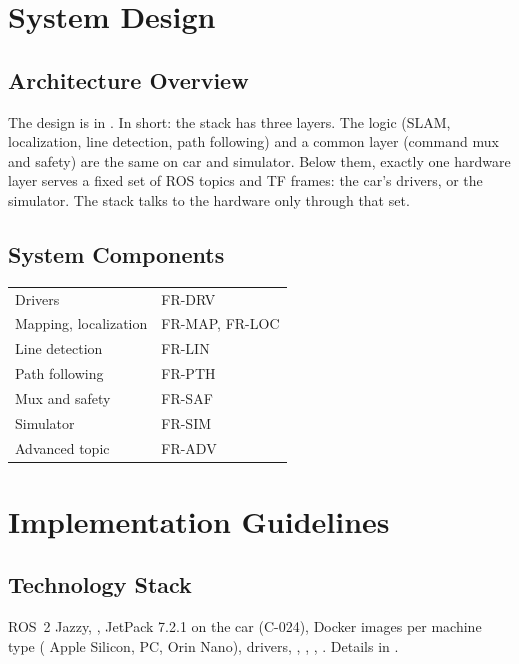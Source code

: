 \documentclass[11pt,a4paper]{article}
\begin{document}
\section{System Design}
\subsection{Architecture Overview}
The design is in . In short: the stack has three layers. The logic (SLAM, localization, line detection, path following) and a common layer (command mux and safety) are the same on car and simulator. Below them, exactly one hardware layer serves a fixed set of ROS topics and TF frames: the car's drivers, or the simulator. The stack talks to the hardware only through that set.

\subsection{System Components}
\begin{tabularx}{\textwidth}{@{}L{3.5cm} Y@{}}
\toprule
{} &  \\
\midrule
Drivers & FR-DRV \\
Mapping, localization & FR-MAP, FR-LOC \\
Line detection & FR-LIN \\
Path following & FR-PTH \\
Mux and safety & FR-SAF \\
Simulator & FR-SIM \\
Advanced topic & FR-ADV \\
\bottomrule
\end{tabularx}

\section{Implementation Guidelines}
\subsection{Technology Stack}
ROS~2 Jazzy, , JetPack 7.2.1 on the car (C-024), Docker images per machine type ( Apple Silicon,  PC,  Orin Nano),  drivers, , , , . Details in .
\end{document}
